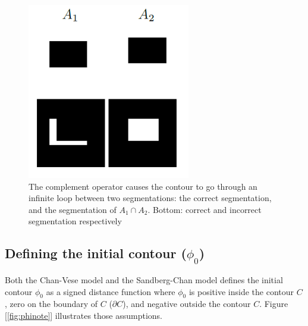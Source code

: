 \documentclass[10pt,twocolumn,letterpaper]{article}
\begin{document}
\begin{figure}[t]
\centering
\includegraphics[width=\textwidth]{sccomp.png}
\caption{The complement operator causes the contour to go through an infinite loop between two segmentations: the correct segmentation, and the segmentation
of $A_1 \cap A_2$. Bottom: correct and incorrect segmentation respectively}
\label{fig:sccomp}
\end{figure}

\subsection{Defining the initial contour ($\phi_0$)}
Both the Chan-Vese model and the Sandberg-Chan model defines the initial contour $\phi_0$ as a signed distance function where $\phi_0$ is positive inside the
contour $C$, zero on the boundary of $C$ ($\partial C$), and negative outside the contour $C$. Figure [\ref{fig:phinote}] illustrates those assumptions.
\end{document}
